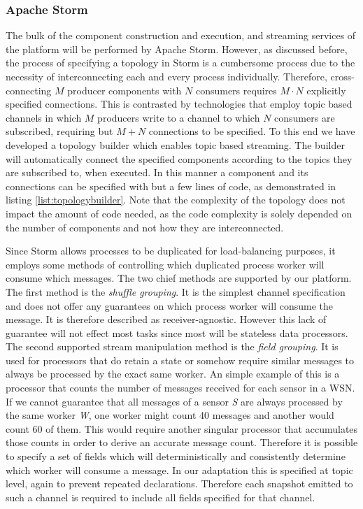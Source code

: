 \subsubsection*{Apache Storm}
The bulk of the component construction and execution, and streaming services of the platform will be performed by Apache Storm. However, as discussed before, the process of specifying a topology in Storm is a cumbersome process due to the necessity of interconnecting each and every process individually. Therefore, cross-connecting $M$ producer components with $N$ consumers requires $M\cdot N$ explicitly specified connections. This is contrasted by technologies that employ topic based channels in which $M$ producers write to a channel to which $N$ consumers are subscribed, requiring but $M+N$ connections to be specified. To this end we have developed a topology builder which enables topic based streaming. The builder will automatically connect the specified components according to the topics they are subscribed to, when executed. In this manner a component and its connections can be specified with but a few lines of code, as demonstrated in listing \ref{list:topologybuilder}. Note that the complexity of the topology does not impact the amount of code needed, as the code complexity is solely depended on the number of components and not how they are interconnected.



Since Storm allows processes to be duplicated for load-balancing purposes, it employs some methods of controlling which duplicated process worker will consume which messages. The two chief methods are supported by our platform. The first method is the \emph{shuffle grouping}. It is the simplest channel specification and does not offer any guarantees on which process worker will consume the message. It is therefore described as receiver-agnostic. However this lack of guarantee will not effect most tasks since most will be stateless data processors. The second supported stream manipulation method is the \emph{field grouping}. It is used for processors that do retain a state or somehow require similar messages to always be processed by the exact same worker. An simple example of this is a processor that counts the number of messages received for each sensor in a WSN. If we cannot guarantee that all messages of a sensor \emph{S} are always processed by the same worker \emph{W}, one worker might count 40 messages and another would count 60 of them. This would require another singular processor that accumulates those counts in order to derive an accurate message count. Therefore it is possible to specify a set of fields which will deterministically and consistently determine which worker will consume a message. In our adaptation this is specified at topic level, again to prevent repeated declarations. Therefore each snapshot emitted to such a channel is required to include all fields specified for that channel.

